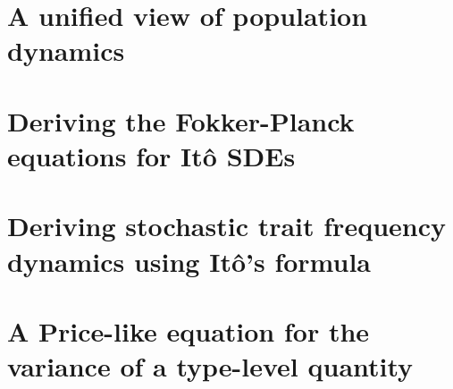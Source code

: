 \documentclass[twoside, 12pt]{iiser-thesis}
\begin{document}
\chapter{A unified view of population dynamics}\label{chap_unification}

%
% 
% 

\cleardoublepage
{}
\appendix
{}

\renewcommand{\chaptername}{Appendix} 
\chapter{Deriving the Fokker-Planck equations for It\^{o} SDEs}\label{App_SDE_FPE}

\chapter{Deriving stochastic trait frequency dynamics using It\^{o}'s formula}\label{App_density_to_freq}

\chapter{A Price-like equation for the variance of a type-level quantity}\label{App_stoch_var_eqns}


\cleardoublepage
{}
\printbibliography
{}
\end{document}
